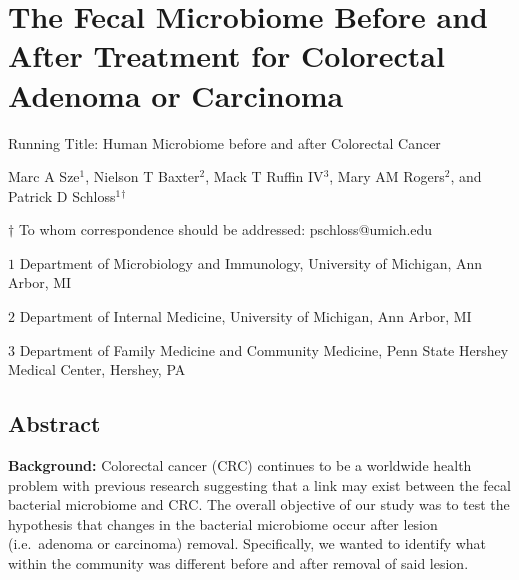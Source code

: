 \documentclass[12pt,]{article}
\title{}
\author{}
\date{}
\begin{document}
\section{The Fecal Microbiome Before and After Treatment for Colorectal
Adenoma or
Carcinoma}\label{the-fecal-microbiome-before-and-after-treatment-for-colorectal-adenoma-or-carcinoma}

\vspace{25mm}

\begin{center}
Running Title: Human Microbiome before and after Colorectal Cancer

\vspace{10mm}

Marc A Sze${^1}$, Nielson T Baxter${^2}$, Mack T Ruffin IV${^3}$, Mary AM Rogers${^2}$, and Patrick D Schloss${^1}$${^\dagger}$

\vspace{20mm}

$\dagger$ To whom correspondence should be addressed: pschloss@umich.edu

$1$ Department of Microbiology and Immunology, University of Michigan, Ann Arbor, MI

$2$ Department of Internal Medicine, University of Michigan, Ann Arbor, MI   

$3$ Department of Family Medicine and Community Medicine, Penn State Hershey Medical Center, Hershey, PA    


\end{center}

\newpage

\linenumbers

\subsection{Abstract}\label{abstract}

\textbf{Background:} Colorectal cancer (CRC) continues to be a worldwide
health problem with previous research suggesting that a link may exist
between the fecal bacterial microbiome and CRC. The overall objective of
our study was to test the hypothesis that changes in the bacterial
microbiome occur after lesion (i.e.~adenoma or carcinoma) removal.
Specifically, we wanted to identify what within the community was
different before and after removal of said lesion.
\end{document}
